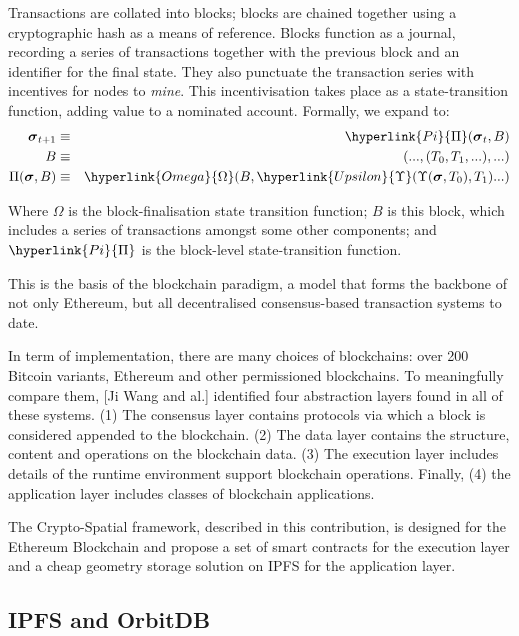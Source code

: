 \documentclass{isprs} %
\begin{document}
Transactions are collated into blocks; blocks are chained together using a cryptographic hash as a means of reference. Blocks function as a journal, recording a series of transactions together with the previous block and an identifier for the final state. They also punctuate the transaction series with incentives for nodes to \textit{mine}. This incentivisation takes place as a state-transition function, adding value to a nominated account. Formally, we expand to:
\begin{eqnarray}
\boldsymbol{\sigma}_{t+1} & \equiv & \hyperlink{Pi}{\Pi}(\boldsymbol{\sigma}_{t}, B) \\
B & \equiv & (..., (T_0, T_1, ...), ...) \\
\Pi(\boldsymbol{\sigma}, B) & \equiv & \hyperlink{Omega}{\Omega}(B, \hyperlink{Upsilon}{\Upsilon}(\Upsilon(\boldsymbol{\sigma}, T_0), T_1) ...)
\end{eqnarray}

Where \hyperlink{Omega}{$\Omega$} is the block-finalisation state transition function; \hyperlink{block}{$B$} is this block, which includes a series of transactions amongst some other components; and $\hyperlink{Pi}{\Pi}$ is the block-level state-transition function.

This is the basis of the blockchain paradigm, a model that forms the backbone of not only Ethereum, but all decentralised consensus-based transaction systems to date.

In term of implementation, there are many choices of blockchains: over 200 Bitcoin variants, Ethereum and other permissioned blockchains. To meaningfully compare them, [Ji Wang and al.] identified four abstraction layers found in all of these systems. (1) The consensus layer contains protocols via which a block is considered appended to the blockchain. (2) The data layer contains the structure, content and operations on the blockchain data. (3) The execution layer includes details of the runtime environment support blockchain operations. Finally, (4) the application layer includes classes of blockchain applications. 

The Crypto-Spatial framework, described in this contribution, is designed for the Ethereum Blockchain and propose a set of smart contracts for the execution layer and a cheap geometry storage solution on IPFS for the application layer.

\subsection{IPFS and OrbitDB}\label{sec:IPFS and OrbitDB}
\end{document}
